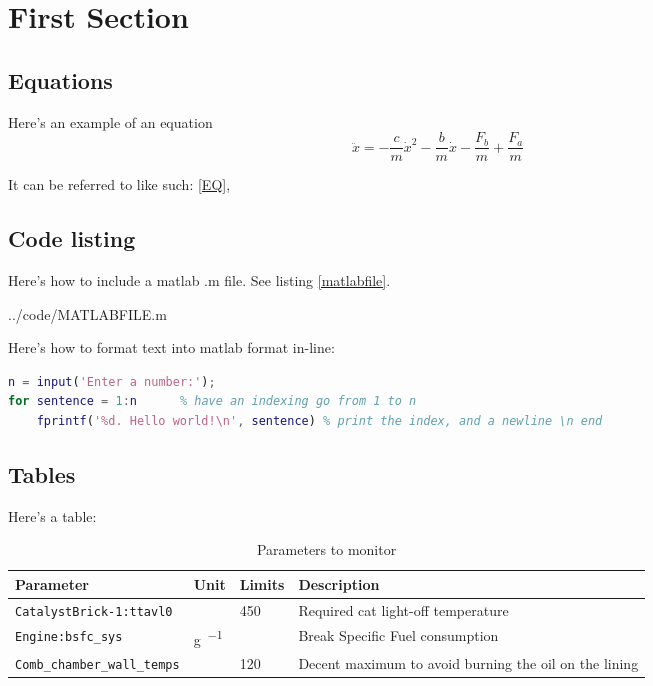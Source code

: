 \documentclass[11pt,a4paper,twoside]{article}
\begin{document}
\section{First Section}


\subsection{Equations}
Here's an example of an equation
\begin{equation}\label{EQ}
\ddot{x}=
-\frac{c}{m}\dot{x}^2
-\frac{b}{m}\dot{x}
-\frac{F_b}{m}
+\frac{F_a}{m}
\end{equation}

It can be referred to like such: \ref{EQ},

\subsection{Code listing}
Here's how to include a matlab .m file. See listing \ref{matlabfile}.


				{../code/MATLABFILE.m}
				

Here's how to format text into matlab format in-line:
\begin{lstlisting}[language=matlab]
% MATLABFILE.m
n = input('Enter a number:');
for sentence = 1:n		% have an indexing go from 1 to n
    fprintf('%d. Hello world!\n', sentence) % print the index, and a newline \n end
\end{lstlisting}


\subsection{Tables}
Here's a table:

\begin{table}[] \centering
\caption{Parameters to monitor}
\label{table:Parameters to monitor}
\begin{tabularx}{\linewidth}{lllX}
\toprule
Parameter 								& Unit					& Limits	& Description 											\\ \midrule
\texttt{CatalystBrick-1:ttavl0}			& \si{\deg}				& 450		& Required cat light-off temperature					\\
\texttt{Engine:bsfc\_sys}				& \si{\gram\per{\kWh}}	& 			& Break Specific Fuel consumption						\\
\texttt{Comb\_chamber\_wall\_temps}		& \si{\deg}				& 120		& Decent maximum to avoid burning the oil on the lining	\\ \bottomrule
\end{tabularx}
\end{table}
\end{document}
